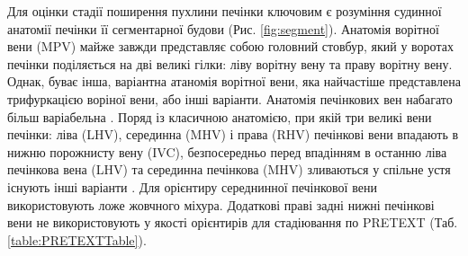 Для оцінки стадії поширення пухлини печінки ключовим є розуміння судинної анатомії печінки її сегментарної будови  (Рис. \ref{fig:segment}). 
Анатомія ворітної вени (MPV) майже завжди представляє собою головний стовбур, який у воротах печінки поділяється на дві великі гілки: ліву ворітну вену та праву ворітну вену. Однак, буває інша, варіантна атаномія ворітної вени, яка найчастіше представлена трифуркацією воріної вени, або інші варіанти.
Анатомія печінкових вен набагато більш варіабельна \cite{pmid22813792}. Поряд із класичною анатомією, при якій три великі вени печінки: ліва (LHV), серединна (MHV) і права (RHV) печінкові вени впадають в нижню порожнисту вену (IVC), безпосередньо перед впадінням в останню ліва печінкова вена (LHV) та серединна печінкова (MHV) зливаються у спільне устя існують інші варіанти \cite{pmid22835780}. 
Для орієнтиру середнинної печінкової вени використовують ложе жовчного міхура. Додаткові праві задні нижні печінкові вени не використовують у якості орієнтирів для стадіювання по PRETEXT (Таб. \ref{table:PRETEXTTable}).

\begin{table}[]
\caption{Cтадіювання гепатобластом по PRETEXT.}
\label{table:PRETEXTTable}
\end{table}

